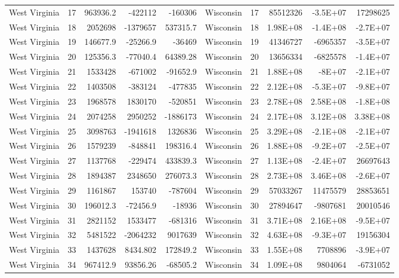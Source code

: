 \begin{table}[]
\begin{tabular}{lrrrrlrrrr}
		West Virginia &  17 & 963936.2 & -422112 & -160306 & Wisconsin &  17 & 85512326 & -3.5E+07 & 17298625 \\
		West Virginia &  18 & 2052698 & -1379657 & 537315.7 & Wisconsin &  18 & 1.98E+08 & -1.4E+08 & -2.7E+07 \\
		West Virginia &  19 & 146677.9 & -25266.9 & -36469 & Wisconsin &  19 & 41346727 & -6965357 & -3.5E+07 \\
		West Virginia &  20 & 125356.3 & -77040.4 & 64389.28 & Wisconsin &  20 & 13656334 & -6825578 & -1.4E+07 \\
		West Virginia &  21 & 1533428 & -671002 & -91652.9 & Wisconsin &  21 & 1.88E+08 & -8E+07 & -2.1E+07 \\
		West Virginia &  22 & 1403508 & -383124 & -477835 & Wisconsin &  22 & 2.12E+08 & -5.3E+07 & -9.8E+07 \\
		West Virginia &  23 & 1968578 & 1830170 & -520851 & Wisconsin &  23 & 2.78E+08 & 2.58E+08 & -1.8E+08 \\
		West Virginia &  24 & 2074258 & 2950252 & -1886173 & Wisconsin &  24 & 2.17E+08 & 3.12E+08 & 3.38E+08 \\
		West Virginia &  25 & 3098763 & -1941618 & 1326836 & Wisconsin &  25 & 3.29E+08 & -2.1E+08 & -2.1E+07 \\
		West Virginia &  26 & 1579239 & -848841 & 198316.4 & Wisconsin &  26 & 1.88E+08 & -9.2E+07 & -2.5E+07 \\
		West Virginia &  27 & 1137768 & -229474 & 433839.3 & Wisconsin &  27 & 1.13E+08 & -2.4E+07 & 26697643 \\
		West Virginia &  28 & 1894387 & 2348650 & 276073.3 & Wisconsin &  28 & 2.73E+08 & 3.46E+08 & -2.6E+07 \\
		West Virginia &  29 & 1161867 & 153740 & -787604 & Wisconsin &  29 & 57033267 & 11475579 & 28853651 \\
		West Virginia &  30 & 196012.3 & -72456.9 & -18936 & Wisconsin &  30 & 27894647 & -9807681 & 20010546 \\
		West Virginia &  31 & 2821152 & 1533477 & -681316 & Wisconsin &  31 & 3.71E+08 & 2.16E+08 & -9.5E+07 \\
		West Virginia &  32 & 5481522 & -2064232 & 9017639 & Wisconsin &  32 & 4.63E+08 & -9.3E+07 & 19156304 \\
		West Virginia &  33 & 1437628 & 8434.802 & 172849.2 & Wisconsin &  33 & 1.55E+08 & 7708896 & -3.9E+07 \\
		West Virginia &  34 & 967412.9 & 93856.26 & -68505.2 & Wisconsin &  34 & 1.09E+08 & 9804064 & -6731052
	\end{tabular}
\end{table}

